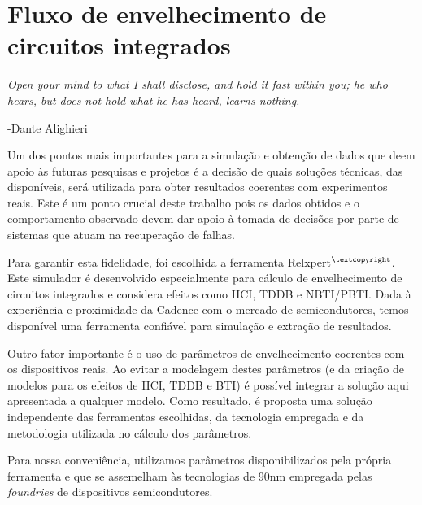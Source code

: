 \chapter{Fluxo de envelhecimento de circuitos integrados}
\epigraph{\textit{Open your mind to what I shall disclose, and hold it fast within you; he who hears, but does not hold what he has heard, learns nothing.}}{-Dante Alighieri}
Um dos pontos mais importantes para a simulação e obtenção de dados que deem apoio às futuras pesquisas e projetos é a decisão de quais soluções técnicas, das disponíveis, será utilizada para obter resultados coerentes com experimentos reais. Este é um ponto crucial deste trabalho pois os dados obtidos e o comportamento observado devem dar apoio à tomada de decisões por parte de sistemas que atuam na recuperação de falhas.

Para garantir esta fidelidade, foi escolhida a ferramenta Relxpert$^{\textcopyright}$. Este simulador é desenvolvido especialmente para cálculo de envelhecimento de circuitos integrados e considera efeitos como HCI, TDDB e NBTI/PBTI. Dada à experiência e proximidade da Cadence com o mercado de semicondutores, temos disponível uma ferramenta confiável para simulação e extração de resultados.

Outro fator importante é o uso de parâmetros de envelhecimento coerentes com os dispositivos reais. Ao evitar a modelagem destes parâmetros (e da criação de modelos para os efeitos de HCI, TDDB e BTI) é possível integrar a solução aqui apresentada a qualquer modelo. Como resultado, é proposta uma solução independente das ferramentas escolhidas, da tecnologia empregada e da metodologia utilizada no cálculo dos parâmetros.

Para nossa conveniência, utilizamos parâmetros disponibilizados pela própria ferramenta e que se assemelham às tecnologias de 90nm empregada pelas \textit{foundries} de dispositivos semicondutores.

